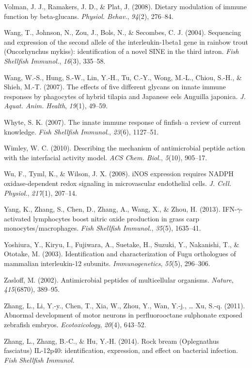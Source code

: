 \documentclass[12pt,a4paper,]{article}
\begin{document}
Volman, J. J., Ramakers, J. D., \& Plat, J. (2008). Dietary modulation
of immune function by beta-glucans. \emph{Physiol. Behav.},
\emph{94}(2), 276--84.

Wang, T., Johnson, N., Zou, J., Bols, N., \& Secombes, C. J. (2004).
Sequencing and expression of the second allele of the interleukin-1beta1
gene in rainbow trout (Oncorhynchus mykiss): identification of a novel
SINE in the third intron. \emph{Fish Shellfish Immunol.}, \emph{16}(3),
335--58.

Wang, W.-S., Hung, S.-W., Lin, Y.-H., Tu, C.-Y., Wong, M.-L., Chiou,
S.-H., \& Shieh, M.-T. (2007). The effects of five different glycans on
innate immune responses by phagocytes of hybrid tilapia and Japanese
eels Anguilla japonica. \emph{J. Aquat. Anim. Health}, \emph{19}(1),
49--59.

Whyte, S. K. (2007). The innate immune response of finfish--a review of
current knowledge. \emph{Fish Shellfish Immunol.}, \emph{23}(6),
1127--51.

Wimley, W. C. (2010). Describing the mechanism of antimicrobial peptide
action with the interfacial activity model. \emph{ACS Chem. Biol.},
\emph{5}(10), 905--17.

Wu, F., Tyml, K., \& Wilson, J. X. (2008). iNOS expression requires
NADPH oxidase-dependent redox signaling in microvascular endothelial
cells. \emph{J. Cell. Physiol.}, \emph{217}(1), 207--14.

Yang, K., Zhang, S., Chen, D., Zhang, A., Wang, X., \& Zhou, H. (2013).
IFN-$\gamma$-activated lymphocytes boost nitric oxide production in
grass carp monocytes/macrophages. \emph{Fish Shellfish Immunol.},
\emph{35}(5), 1635--41.

Yoshiura, Y., Kiryu, I., Fujiwara, A., Suetake, H., Suzuki, Y.,
Nakanishi, T., \& Ototake, M. (2003). Identification and
characterization of Fugu orthologues of mammalian interleukin-12
subunits. \emph{Immunogenetics}, \emph{55}(5), 296--306.

Zasloff, M. (2002). Antimicrobial peptides of multicellular organisms.
\emph{Nature}, \emph{415}(6870), 389--95.

Zhang, L., Li, Y.-y., Chen, T., Xia, W., Zhou, Y., Wan, Y.-j., \ldots{}
Xu, S.-q. (2011). Abnormal development of motor neurons in
perfluorooctane sulphonate exposed zebrafish embryos.
\emph{Ecotoxicology}, \emph{20}(4), 643--52.

Zhang, L., Zhang, B.-C., \& Hu, Y.-H. (2014). Rock bream (Oplegnathus
fasciatus) IL-12p40: identification, expression, and effect on bacterial
infection. \emph{Fish Shellfish Immunol.}
\end{document}
